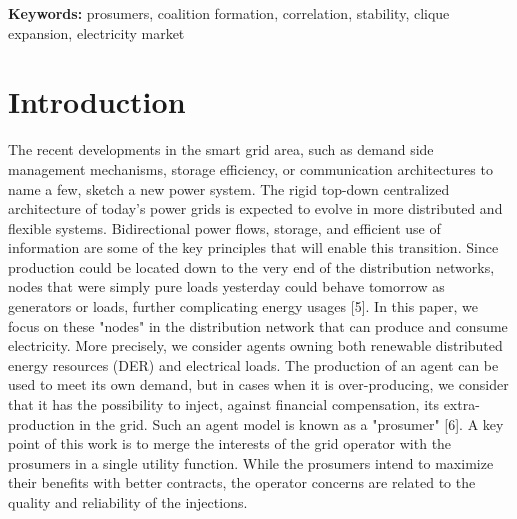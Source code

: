 \documentclass[journal]{IEEEtran}
\begin{document}
\IEEEpeerreviewmaketitle

{\bf Keywords:} prosumers, coalition formation, correlation, stability, clique expansion, electricity market
%
%
\section{Introduction}
\label{sec:introduction}

The recent developments in the smart grid area, such as demand side management mechanisms, storage efficiency, or communication architectures to name a few, sketch a new power system. The rigid top-down centralized architecture of today’s power grids is expected to evolve in more distributed and flexible systems. Bidirectional power flows, storage, and efficient use of information are some of the key principles that will enable this transition. Since production could be located down to the very end of the distribution networks, nodes that were simply pure loads yesterday could behave tomorrow as generators or loads, further complicating energy usages [5]. 
In this paper, we focus on these "nodes" in the distribution network that can produce and consume electricity. More precisely, we consider agents owning both renewable distributed energy resources (DER) and electrical loads. The production of an agent can be used to meet its own demand, but in cases when it is over-producing, we consider that it has the possibility to inject, against financial compensation, its extra-production in the grid. Such an agent model is known as a "prosumer" [6]. A key point of this work is to merge the interests of the grid operator with the prosumers in a single utility function. While the prosumers intend to maximize their benefits with better contracts, the operator concerns are related to the quality and reliability of the injections. 



\end{document}
